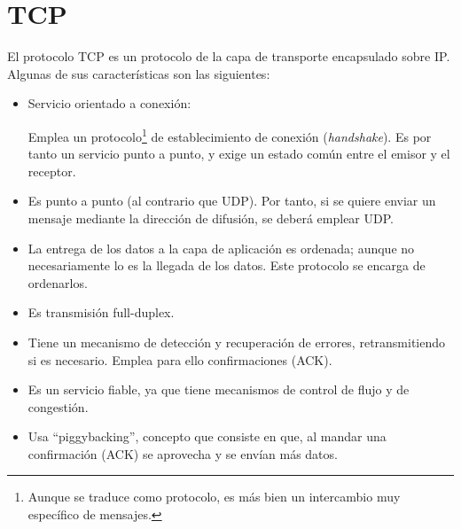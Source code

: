 \section{\acrfull{TCP}}
El protocolo \acrshort{TCP} es un protocolo de la capa de transporte encapsulado sobre \acrshort{IP}. Algunas de sus características son las siguientes:
\begin{itemize}
    \item Servicio orientado a conexión:
    
    Emplea un protocolo\footnote{Aunque se traduce como protocolo, es más bien un intercambio muy específico de mensajes.} de establecimiento de conexión (\textit{handshake}). Es por tanto un servicio punto a punto, y exige un estado común entre el emisor y el receptor. 
    
    \item Es punto a punto (al contrario que \acrshort{UDP}). Por tanto, si se quiere enviar un mensaje mediante la dirección de difusión, se deberá emplear \acrshort{UDP}.
    
    \item La entrega de los datos a la capa de aplicación es ordenada; aunque no necesariamente lo es la llegada de los datos. Este protocolo se encarga de ordenarlos.
    \item Es transmisión full-duplex.
    \item Tiene un mecanismo de detección y recuperación de errores, retransmitiendo si es necesario. Emplea para ello confirmaciones (\acrshort{ACK}).
    \item Es un servicio fiable, ya que tiene mecanismos de control de flujo y de congestión.
    \item Usa ``piggybacking'', concepto que consiste en que, al mandar una confirmación (\acrshort{ACK}) se aprovecha y se envían más datos.
\end{itemize}

